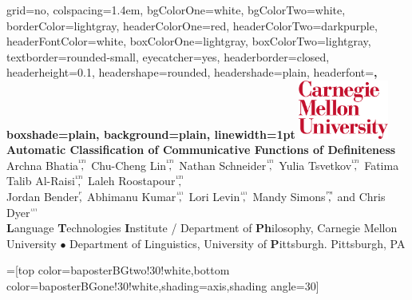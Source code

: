 \documentclass[portrait,final]{baposter}
\begin{document}
\begin{poster}{
  grid=no,
  colspacing=1.4em,
  bgColorOne=white, %
  bgColorTwo=white, %
  borderColor=lightgray, %
  headerColorOne=red, %
  headerColorTwo=darkpurple, %
  headerFontColor=white,
  boxColorOne=lightgray, %
  boxColorTwo=lightgray, %
  textborder=rounded-small, %
  eyecatcher=yes,
  headerborder=closed,
  headerheight=0.1\textheight,
  headershape=rounded, %
  headershade=plain,
  headerfont=\large\bf\sc\textsf, %
  boxshade=plain,
  background=plain,
  linewidth=1pt
}
  {%
\includegraphics[width=8em]{img/cmu_logo}\\
} %
  {\bf %
  \textbf{Automatic Classification of Communicative Functions of Definiteness}
  }
  {\large %
  Archna Bhatia$\overset{^\textsc{lti}}{\textrm{,}}$ Chu-Cheng Lin$\overset{^\textsc{lti}}{\textrm{,}}$ Nathan Schneider$\overset{^\textsc{lti}}{\textrm{,}}$ Yulia Tsvetkov$\overset{^\textsc{lti}}{\textrm{,}}$ Fatima Talib Al-Raisi$\overset{^\textsc{lti}}{\textrm{,}}$ Laleh Roostapour$\overset{^\textsc{lti}}{\textrm{,}}$ \\ Jordan Bender$\overset{^\textsc{p}}{\textrm{,}}$ Abhimanu Kumar$\overset{^\textsc{lti}}{\textrm{,}}$ Lori Levin$\overset{^\textsc{lti}}{\textrm{,}}$ Mandy Simons$\overset{^\textsc{ph}}{\textrm{,}}$ and Chris Dyer$\overset{^\textsc{lti}}{\textrm{}}$
  \\
  \textbf{L}anguage \textbf{T}echnologies \textbf{I}nstitute / Department of \textbf{Ph}ilosophy, Carnegie Mellon University $\bullet$ Department of Linguistics, University of \textbf{P}ittsburgh. Pittsburgh, PA
  }

  =[top color=baposterBGtwo!30!white,bottom color=baposterBGone!30!white,shading=axis,shading angle=30]


\end{poster}
\end{document}
